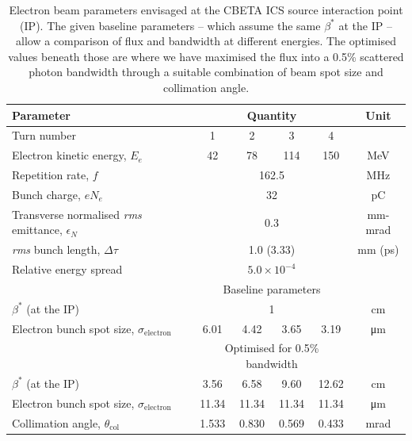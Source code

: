 \documentclass[../main.tex]{subfiles}
\begin{document}
\begin{table}[!h]
\caption{Electron beam parameters envisaged at the CBETA ICS source interaction point (IP). The given baseline parameters -- which assume the same $\beta^*$ at the IP -- allow a comparison of flux and bandwidth at different energies. The optimised values beneath those are where we have maximised the flux into a 0.5\% scattered photon bandwidth through a suitable combination of beam spot size and collimation angle.}
\vspace{3mm}
\begin{tabular}{lccccc}
\hline\hline
Parameter & \multicolumn{4}{c}{Quantity} & Unit \\
\hline
Turn number & 1 & 2 & 3 & 4 & \\
Electron kinetic energy, $E_e$ & 42 & 78 & 114 & 150 & MeV\\
Repetition rate, $f$ & \multicolumn{4}{c}{162.5} & MHz\\
Bunch charge, $e N_e$ & \multicolumn{4}{c}{32} & pC \\
Transverse normalised \textit{rms} emittance, $\epsilon_{N}$ & \multicolumn{4}{c}{0.3} & mm-mrad\\
\textit{rms} bunch length, $\Delta \tau$ & \multicolumn{4}{c}{1.0 (3.33)} & mm (ps)\\
Relative energy spread & \multicolumn{4}{c}{$5.0\times 10^{-4}$} & \\
\hline
 & \multicolumn{4}{c}{Baseline parameters} & \\
\hline
$\beta^*$ (at the IP) & \multicolumn{4}{c}{1} & cm\\
Electron bunch spot size, $\sigma_{\mathrm{electron}}$ & 6.01 & 4.42 & 3.65 & 3.19  & \si{\micro\meter} \\
\hline
 & \multicolumn{4}{c}{Optimised for 0.5\% bandwidth} & \\
\hline
$\beta^*$ (at the IP) & 3.56 & 6.58 & 9.60 & 12.62 & cm\\
Electron bunch spot size, $\sigma_{\mathrm{electron}}$ & 11.34 & 11.34 & 11.34 & 11.34  & \si{\micro\meter}\\
Collimation angle, $\theta_{\mathrm{col}}$ & 1.533 & 0.830 & 0.569 & 0.433 & mrad\\
\hline\hline
\end{tabular}
\label{TABLE:CBETA_electron_beam_design_parameters}
\end{table}
\end{document}
